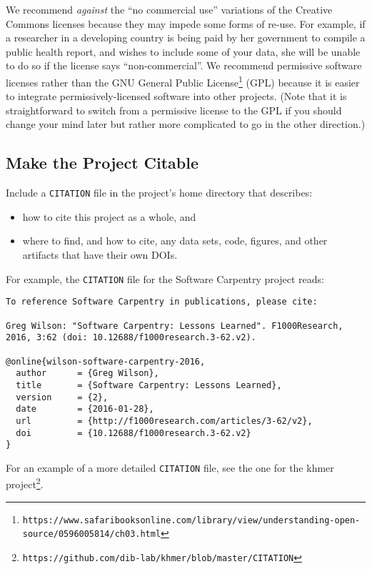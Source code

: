 \documentclass[10pt]{article}
\newcommand{\withurl}[2]{{#1}\footnote{\texttt{#2}}}
\begin{document}
We recommend \emph{against} the ``no commercial use'' variations of
the Creative Commons licenses because they may impede some forms of
re-use.  For example, if a researcher in a developing country is being
paid by her government to compile a public health report, and wishes
to include some of your data, she will be unable to do so if the
license says ``non-commercial''. We recommend permissive software
licenses rather than the \withurl{GNU General Public
  License}{https://www.safaribooksonline.com/library/view/understanding-open-source/0596005814/ch03.html}
(GPL) because it is easier to integrate permissively-licensed software
into other projects. (Note that it is straightforward to switch from a
permissive license to the GPL if you should change your mind later but
rather more complicated to go in the other direction.)

\subsection*{Make the Project Citable}

Include a \texttt{CITATION} file in the project's home directory that
describes:

\begin{itemize}
\item
  how to cite this project as a whole, and
\item
  where to find, and how to cite, any data sets, code, figures, and
  other artifacts that have their own DOIs.
\end{itemize}

For example, the \texttt{CITATION} file for the Software Carpentry
project reads:

\begin{verbatim}
To reference Software Carpentry in publications, please cite:

Greg Wilson: "Software Carpentry: Lessons Learned". F1000Research,
2016, 3:62 (doi: 10.12688/f1000research.3-62.v2).

@online{wilson-software-carpentry-2016,
  author      = {Greg Wilson},
  title       = {Software Carpentry: Lessons Learned},
  version     = {2},
  date        = {2016-01-28},
  url         = {http://f1000research.com/articles/3-62/v2},
  doi         = {10.12688/f1000research.3-62.v2}
}
\end{verbatim}

For an example of a more detailed \texttt{CITATION} file, see the one
for the \withurl{khmer
  project}{https://github.com/dib-lab/khmer/blob/master/CITATION}.
\end{document}
